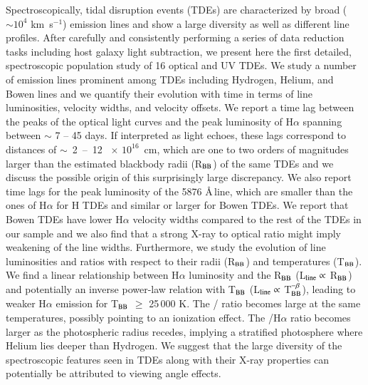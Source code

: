 \documentclass[structabstract]{aa}
\begin{document}

  \abstract
   {Spectroscopically, tidal disruption events (TDEs) are characterized by broad ($\sim 10^{4}$ km~s$^{-1}$) emission lines and show a large diversity as well as different line profiles. After carefully and consistently performing a series of data reduction tasks including host galaxy light subtraction, we present here the first detailed, spectroscopic population study of 16 optical and UV TDEs. We study a number of emission lines prominent among TDEs including Hydrogen, Helium, and Bowen lines and we quantify their evolution with time in terms of line luminosities, velocity widths, and velocity offsets. We report a time lag between the peaks of the optical light curves and the peak luminosity of H$\alpha$ spanning between $\sim$ 7 -- 45 days. If interpreted as light echoes, these lags correspond to distances of $\sim$~2~--~12~$\,\times\,10^{16}$~cm, which are one to two orders of magnitudes larger than the estimated blackbody radii (R$_{\rm BB}$) of the same TDEs and we discuss the possible origin of this surprisingly large discrepancy. We also report time lags for the peak luminosity of the  5876 \AA\,line, which are smaller than the ones of H$\alpha$ for H TDEs and similar or larger for  Bowen TDEs. We report that  Bowen TDEs have lower H$\alpha$ velocity widths compared to the rest of the TDEs in our sample and we also find that a strong X-ray to optical ratio might imply weakening of the line widths. Furthermore, we study the evolution of line luminosities and ratios with respect to their radii (R$_{\rm BB}$) and temperatures (T$_{\rm BB}$). We find a linear relationship between H$\alpha$ luminosity and the R$_{\rm BB}$ (L$_{\rm line} \propto$ R$_{\rm BB}$) and potentially an inverse power-law relation with T$_{\rm BB}$ (L$_{\rm line} \propto$ T$_{\rm BB}^{-\beta}$), leading to weaker H$\alpha$ emission for T$_{\rm BB}$ $\geq$ 25\,000 K. The / ratio becomes large at the same temperatures, possibly pointing to an ionization effect. The /H$\alpha$ ratio becomes larger as the photospheric radius recedes, implying a stratified photosphere where Helium lies deeper than Hydrogen. We suggest that the large diversity of the spectroscopic features seen in TDEs along with their X-ray properties can potentially be attributed to viewing angle effects.}
   
\end{document}
